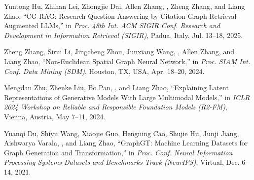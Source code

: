 
\begin{pubSubsectionNum}
    \item Yuntong Hu, Zhihan Lei, Zhongjie Dai, Allen Zhang, \angrykoala, Zheng Zhang, and Liang Zhao, ``CG-RAG: Research Question Answering by Citation Graph Retrieval-Augmented LLMs,'' in \textit{Proc. 48th Int. ACM SIGIR Conf. Research and Development in Information Retrieval (SIGIR)}, Padua, Italy, Jul. 13--18, 2025.
    \item Zheng Zhang, Sirui Li, Jingcheng Zhou, Junxiang Wang, \angrykoala, Allen Zhang, and Liang Zhao, ``Non-Euclidean Spatial Graph Neural Network,'' in \textit{Proc. SIAM Int. Conf. Data Mining (SDM)}, Houston, TX, USA, Apr. 18--20, 2024.
    \item Mengdan Zhu, Zhenke Liu, Bo Pan, \angrykoala, and Liang Zhao, ``Explaining Latent Representations of Generative Models With Large Multimodal Models,'' in \textit{ICLR 2024 Workshop on Reliable and Responsible Foundation Models (R2-FM)}, Vienna, Austria, May 7--11, 2024.
    \item Yuanqi Du, Shiyu Wang, Xiaojie Guo, Hengning Cao, Shujie Hu, Junji Jiang, Aishwarya Varala, \angrykoala, and Liang Zhao, ``GraphGT: Machine Learning Datasets for Graph Generation and Transformation,'' in \textit{Proc. Conf. Neural Information Processing Systems Datasets and Benchmarks Track (NeurIPS)}, Virtual, Dec. 6--14, 2021.
\end{pubSubsectionNum}

%

